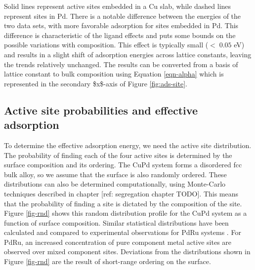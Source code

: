 \documentclass[12pt]{cmuthesis}
\begin{document}
Solid lines represent active sites embedded in a Cu slab, while dashed lines represent sites in Pd. There is a notable difference between the energies of the two data sets, with more favorable adsorption for sites embedded in Pd. This difference is characteristic of the ligand effects and puts some bounds on the possible variations with composition. This effect is typically small (\(< \; 0.05\) eV) and results in a slight shift of adsorption energies across lattice constants, leaving the trends relatively unchanged. The results can be converted from a basis of lattice constant to bulk composition using Equation \eqref{eqn-alpha} which is represented in the secondary \$x\$-axis of Figure \ref{fig:ads-site}.

\subsection{Active site probabilities and effective adsorption}
\label{sec:orgcebae09}
To determine the effective adsorption energy, we need the active site distribution. The probability of finding each of the four active sites is determined by the surface composition and its ordering. The CuPd system forms a disordered fcc bulk alloy, so we assume that the surface is also randomly ordered. These distributions can also be determined computationally, using Monte-Carlo techniques described in chapter [ref: segregation chapter TODO]. This means that the probability of finding a site is dictated by the composition of the site. Figure \ref{fig-rnd} shows this random distribution profile for the CuPd system as a function of surface composition. Similar statistical distributions have been calculated and compared to experimental observations for PdRu systems \cite{hartmann-2009-surfac-pdru}. For PdRu, an increased concentration of pure component metal active sites are observed over mixed component sites. Deviations from the distributions shown in Figure \ref{fig-rnd} are the result of short-range ordering on the surface.
\end{document}

